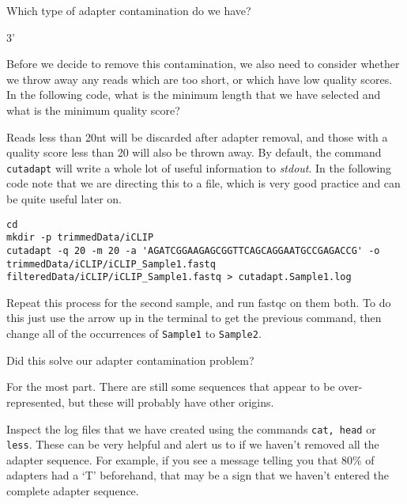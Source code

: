 \begin{questions}
Which type of adapter contamination do we have? \\
\begin{answer}
3'
\end{answer}

Before we decide to remove this contamination, we also need to consider whether we throw away any reads which are too short, or which have low quality scores.
In the following code, what is the minimum length that we have selected and what is the minimum quality score?\\
\begin{answer}
Reads less than 20nt will be discarded after adapter removal, and those with a quality score less than 20 will also be thrown away.
By default, the command \texttt{cutadapt} will write a whole lot of useful information to \textit{stdout}.
In the following code note that we are directing this to a file, which is very good practice and can be quite useful later on.
\end{answer}
\end{questions}

\begin{steps}
\begin{minipage}{\textwidth}
\begin{lstlisting}
cd
mkdir -p trimmedData/iCLIP
cutadapt -q 20 -m 20 -a 'AGATCGGAAGAGCGGTTCAGCAGGAATGCCGAGACCG' -o trimmedData/iCLIP/iCLIP_Sample1.fastq filteredData/iCLIP/iCLIP_Sample1.fastq > cutadapt.Sample1.log
\end{lstlisting}
\end{minipage}
Repeat this process for the second sample, and run fastqc on them both.
To do this just use the arrow up in the terminal to get the previous command, then change all of the occurrences of \texttt{Sample1} to \texttt{Sample2}.
\end{steps}

\begin{questions}
Did this solve our adapter contamination problem?\\
\begin{answer}
For the most part.
There are still some sequences that appear to be over-represented, but these will probably have other origins.
\end{answer}
\end{questions}

\begin{steps}
Inspect the log files that we have created using the commands \texttt{cat, head} or \texttt{less}.
These can be very helpful and alert us to if we haven't removed all the adapter sequence.
For example, if you see a message telling you that 80\% of adapters had a `T' beforehand, that may be a sign that we haven't entered the complete adapter sequence.
\end{steps}


